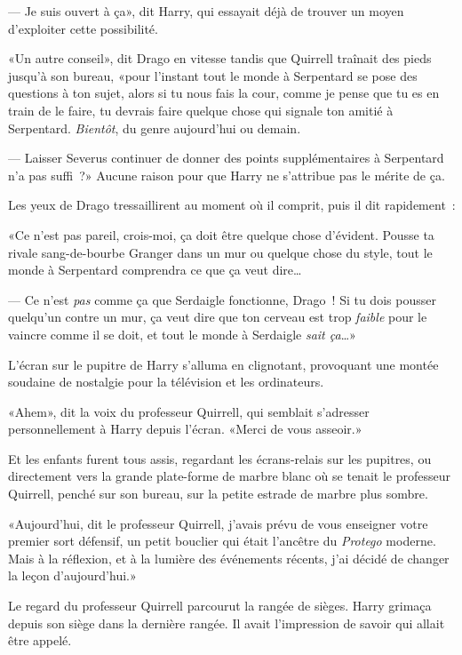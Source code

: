 --- Je suis ouvert à ça», dit Harry, qui essayait déjà de trouver un moyen d'exploiter cette possibilité.

«Un autre conseil», dit Drago en vitesse tandis que Quirrell traînait des pieds jusqu'à son bureau, «pour l'instant tout le monde à Serpentard se pose des questions à ton sujet, alors si tu nous fais la cour, comme je pense que tu es en train de le faire, tu devrais faire quelque chose qui signale ton amitié à Serpentard. \emph{Bientôt}, du genre aujourd'hui ou demain.

--- Laisser Severus continuer de donner des points supplémentaires à Serpentard n'a pas suffi~?» Aucune raison pour que Harry ne s'attribue pas le mérite de ça.

Les yeux de Drago tressaillirent au moment où il comprit, puis il dit rapidement~:

«Ce n'est pas pareil, crois-moi, ça doit être quelque chose d'évident. Pousse ta rivale sang-de-bourbe Granger dans un mur ou quelque chose du style, tout le monde à Serpentard comprendra ce que ça veut dire…

--- Ce n'est \emph{pas} comme ça que Serdaigle fonctionne, Drago~! Si tu dois pousser quelqu'un contre un mur, ça veut dire que ton cerveau est trop \emph{faible} pour le vaincre comme il se doit, et tout le monde à Serdaigle \emph{sait ça}…»

L'écran sur le pupitre de Harry s'alluma en clignotant, provoquant une montée soudaine de nostalgie pour la télévision et les ordinateurs.

«Ahem», dit la voix du professeur Quirrell, qui semblait s'adresser personnellement à Harry depuis l'écran. «Merci de vous asseoir.»

\later

Et les enfants furent tous assis, regardant les écrans-relais sur les pupitres, ou directement vers la grande plate-forme de marbre blanc où se tenait le professeur Quirrell, penché sur son bureau, sur la petite estrade de marbre plus sombre.

«Aujourd'hui, dit le professeur Quirrell, j'avais prévu de vous enseigner votre premier sort défensif, un petit bouclier qui était l'ancêtre du \emph{Protego} moderne. Mais à la réflexion, et à la lumière des événements récents, j'ai décidé de changer la leçon d'aujourd'hui.»

Le regard du professeur Quirrell parcourut la rangée de sièges. Harry grimaça depuis son siège dans la dernière rangée. Il avait l'impression de savoir qui allait être appelé.

